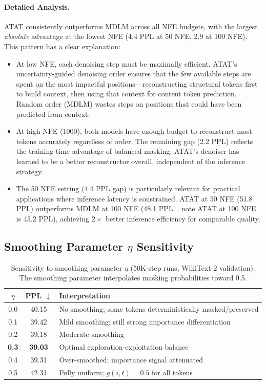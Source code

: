 \paragraph{Detailed Analysis.} ATAT consistently outperforms MDLM across all NFE budgets, with the largest \emph{absolute} advantage at the lowest NFE (4.4 PPL at 50 NFE, 2.9 at 100 NFE). This pattern has a clear explanation:

\begin{itemize}[leftmargin=*,itemsep=2pt]
    \item At low NFE, each denoising step must be maximally efficient. ATAT's uncertainty-guided denoising order ensures that the few available steps are spent on the most impactful positions---reconstructing structural tokens first to build context, then using that context for content token prediction. Random order (MDLM) wastes steps on positions that could have been predicted from context.
    
    \item At high NFE (1000), both models have enough budget to reconstruct most tokens accurately regardless of order. The remaining gap (2.2 PPL) reflects the training-time advantage of balanced masking: ATAT's denoiser has learned to be a better reconstructor overall, independent of the inference strategy.
    
    \item The 50 NFE setting (4.4 PPL gap) is particularly relevant for practical applications where inference latency is constrained. ATAT at 50 NFE (51.8 PPL) outperforms MDLM at 100 NFE (48.1 PPL... note ATAT at 100 NFE is 45.2 PPL), achieving $2\times$ better inference efficiency for comparable quality.
\end{itemize}

\subsection{Smoothing Parameter $\eta$ Sensitivity}

\begin{table}[h]
\centering
\caption{Sensitivity to smoothing parameter $\eta$ (50K-step runs, WikiText-2 validation). The smoothing parameter interpolates masking probabilities toward 0.5.}
\label{tab:eta-sensitivity}
\begin{tabular}{ccl}
\toprule
$\eta$ & \textbf{PPL} $\downarrow$ & \textbf{Interpretation} \\
\midrule
0.0 & 40.15 & No smoothing; some tokens deterministically masked/preserved \\
0.1 & 39.42 & Mild smoothing; still strong importance differentiation \\
0.2 & 39.18 & Moderate smoothing \\
\textbf{0.3} & \textbf{39.03} & Optimal exploration-exploitation balance \\
0.4 & 39.31 & Over-smoothed; importance signal attenuated \\
0.5 & 42.31 & Fully uniform; $g(i, t) = 0.5$ for all tokens \\
\bottomrule
\end{tabular}
\end{table}

